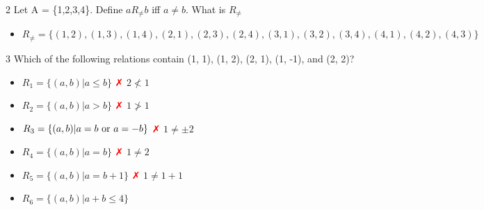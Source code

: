\documentclass[12pt, letterpaper]{article}
\newcommand{\exheader}[1][ex]{{\tiny{#1}\normalsize}}
\begin{document}
\bigbreak

\exheader[2] Let A = \{1,2,3,4\}. Define $a R_{\not =}b$ iff $a \not = b$. What is $R_{\not =}$
\begin{itemize}[leftmargin=*, label={}]
	\item $R_{\not =} = \{(1, 2), (1, 3), (1, 4), (2, 1), (2, 3), (2, 4), (3, 1), (3, 2), (3, 4), (4, 1), (4, 2), (4, 3)\}$
\end{itemize}

\bigbreak

\exheader[3] Which of the following relations contain (1, 1), (1, 2), (2, 1), (1, -1), and (2, 2)?
\begin{itemize}[leftmargin=*, label={}]
	\item $R_1 = \{(a,b) | a \le b\}$ \textcolor{red}{\faClose} \quad $2 \not < 1$
	\item $R_2 = \{(a,b) | a > b \}$ \textcolor{red}{\faClose} \quad $1 \not > 1$
	\item $R_3 = \{(a,b) | a = b \textnormal{ or } a = -b \}$ \textcolor{red}{\faClose} \quad $1 \not = \pm 2$
	\item $R_4 = \{(a,b) | a = b \}$ \textcolor{red}{\faClose} $1 \not = 2$
	\item $R_5 = \{(a,b) | a = b + 1 \}$ \textcolor{red}{\faClose} $1 \not = 1 + 1$
	\item $R_6 = \{(a,b) | a + b \le 4 \}$ \textcolor{green}{\checkmark}
\end{itemize}

\pagebreak
\vspace*{-3cm}
\end{document}

